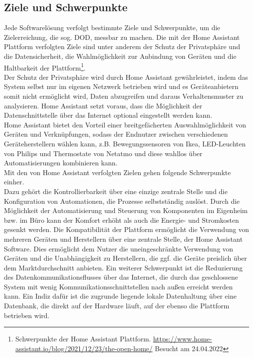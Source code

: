 \subsection{Ziele und Schwerpunkte}
    Jede Softwarelösung verfolgt bestimmte Ziele und Schwerpunkte, um die Zielerreichung, die sog. \ac{DOD}, messbar zu machen. Die mit 
    der Home Assistant Plattform verfolgten Ziele sind unter anderem der Schutz der Privatsphäre und die Datensicherheit, die Wahlmöglichkeit zur Anbindung von 
    Geräten und die Haltbarkeit der Plattform\footnote{Schwerpunkte der Home Assistant Plattform. \url{https://www.home-assistant.io/blog/2021/12/23/the-open-home/} Besucht am 24.04.2022}. 
    \\
    \linebreak
    Der Schutz der Privatsphäre wird durch Home Assistant gewährleistet, indem das System selbst nur im eigenen Netzwerk betrieben wird und es 
    Geräteanbietern somit nicht ermöglicht wird, Daten abzugreifen und daraus Verhaltensmuster zu analysieren. Home Assistant setzt voraus, dass die 
    Möglichkeit der Datenschnittstelle über das Internet optional eingestellt werden kann. 
    \\
    Home Assistant bietet den Vorteil einer breitgefächerten Auswahlmöglichkeit von Geräten und Verknüpfungen, sodass der Endnutzer zwischen verschiedenen 
    Geräteherstellern wählen kann, z.B. Bewegungssensoren von Ikea, LED-Leuchten von Philips und Thermostate von Netatmo und diese wahllos über 
    Automatisierungen kombinieren kann. 
    \\
    Mit den von Home Assistant verfolgten Zielen gehen folgende Schwerpunkte einher.
    \\
    \linebreak
    \linebreak
    Dazu gehört die Kontrollierbarkeit über eine einzige zentrale Stelle und die Konfiguration von 
    Automationen, die Prozesse selbstständig auslöst. Durch die Möglichkeit der Automatisierung und Steuerung von Komponenten im Eigenheim 
    bzw. im Büro kann der Komfort erhöht als auch die Energie- und Stromkosten gesenkt werden. Die Kompatibilität der Plattform 
    ermöglicht die Verwendung von mehreren Geräten und Herstellern über eine zentrale Stelle, der Home Assistant Software. Dies ermöglicht 
    dem Nutzer die uneingeschränkte Verwendung von Geräten und die Unabhängigkeit zu Herstellern, die ggf. die Geräte preislich über dem 
    Marktdurchschnitt anbieten. Ein weiterer Schwerpunkt ist die Reduzierung des Datenkommunikationsflusses über das Internet, die durch das 
    geschlossene System mit wenig Kommunikationsschnittstellen nach außen erreicht werden kann. Ein Indiz dafür ist die zugrunde liegende 
    lokale Datenhaltung über eine Datenbank, die direkt auf der Hardware läuft, auf der ebenso die Plattform betrieben wird. 

